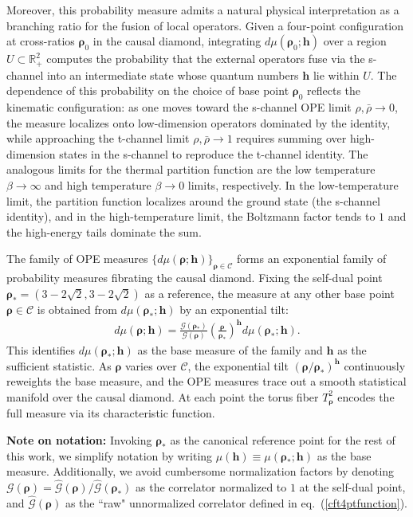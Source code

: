 \documentclass[a4paper,11pt]{article}
\theoremstyle{plain}
\theoremstyle{definition}
\theoremstyle{remark}
\newcommand{\bs}[1]{\boldsymbol{#1}}
\newcommand{\ba}{\begin{equation} \begin{aligned}}
\newcommand{\ea}{\end{aligned} \end{equation}}
\begin{document}
Moreover, this probability measure admits a natural physical interpretation as a branching ratio for the fusion of local operators. Given a four-point configuration at cross-ratios $\bs{\rho}_0$ in the causal diamond, integrating $d\mu(\bs{\rho}_0;\bs{h})$ over a region $U \subset \mathbb{R}^2_+$ computes the probability that the external operators fuse via the s-channel into an intermediate state whose quantum numbers $\bs{h}$ lie within $U$. The dependence of this probability on the choice of base point $\bs{\rho}_0$ reflects the kinematic configuration: as one moves toward the s-channel OPE limit $\rho ,\bar{\rho}\to 0$, the measure localizes onto low-dimension operators dominated by the identity, while approaching the t-channel limit $\rho,\bar{\rho} \to 1$ requires summing over high-dimension states in the s-channel to reproduce the t-channel identity. The analogous limits for the thermal partition function are the low temperature $\beta \to \infty$ and high temperature $\beta \to 0$ limits, respectively. In the low-temperature limit, the partition function localizes around the ground state (the s-channel identity), and in the high-temperature limit, the Boltzmann factor tends to $1$ and the high-energy tails dominate the sum.

The family of OPE measures $\{ d\mu(\bs{\rho};\bs{h}) \}_{\bs{\rho} \in \mathscr{C}}$ forms an exponential family of probability measures fibrating the causal diamond. Fixing the self-dual point $\bs{\rho}_* = (3-2\sqrt{2},3-2\sqrt{2})$ as a reference, the measure at any other base point $\bs{\rho} \in \mathscr{C}$ is obtained from $d\mu(\bs{\rho}_*;\bs{h})$ by an exponential tilt:
\ba
d\mu(\bs{\rho};\bs{h}) = \frac{\mathcal{G}(\bs{\rho}_*)}{\mathcal{G}(\bs{\rho})} \left(\frac{\bs{\rho}}{\bs{\rho}_*}\right)^{\bs{h}} d\mu(\bs{\rho}_*;\bs{h}).
\ea
This identifies $d\mu(\bs{\rho}_*;\bs{h})$ as the base measure of the family and $\bs{h}$ as the sufficient statistic. As $\bs{\rho}$ varies over $\mathscr{C}$, the exponential tilt $(\bs{\rho}/\bs{\rho}_*)^{\bs{h}}$ continuously reweights the base measure, and the OPE measures trace out a smooth statistical manifold over the causal diamond. At each point the torus fiber $T^2_{\bs{\rho}}$ encodes the full measure via its characteristic function. 
 
\textbf{Note on notation:} Invoking $\bs{\rho}_*$ as the canonical reference point for the rest of this work, we simplify notation by writing $\mu(\bs{h}) \equiv \mu(\bs{\rho}_*; \bs{h})$ as the base measure. Additionally, we avoid cumbersome normalization factors by denoting $\mathcal{G}(\bs{\rho}) = \widehat{\mathcal{G}}(\bs{\rho})/\widehat{\mathcal{G}}(\bs{\rho}_*)$ as the correlator normalized to $1$ at the self-dual point, and $\widehat{\mathcal{G}}(\bs{\rho})$ as the ``raw" unnormalized correlator defined in eq.~(\ref{cft4ptfunction}).
\end{document}
